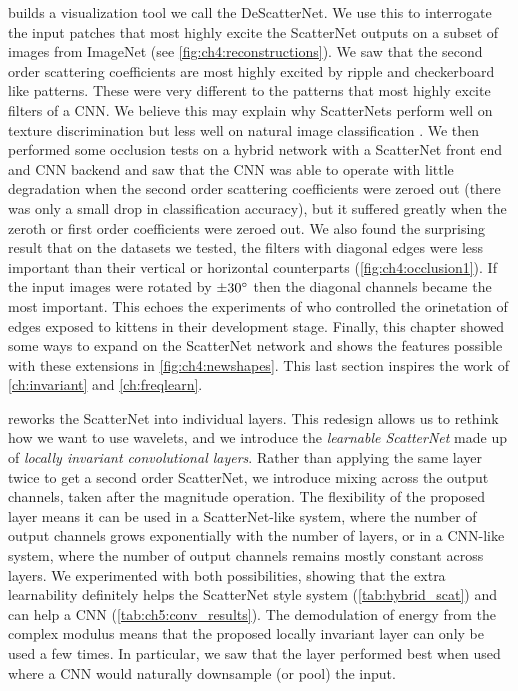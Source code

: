 \textbf{} builds a visualization tool we call the
DeScatterNet. We use this to interrogate the input patches that most highly
excite the ScatterNet outputs on a subset of images from ImageNet (see
\autoref{fig:ch4:reconstructions}). We saw that
the second order scattering coefficients are most highly excited by ripple and
checkerboard like patterns. These were very different to the patterns
that most highly excite filters of a CNN. We believe this may explain why
ScatterNets perform well on texture discrimination \cite{bruna_invariant_2013}
but less well on natural image classification \cite{oyallon_deep_2015}. We then
performed some occlusion tests on a hybrid network with a ScatterNet front end
and CNN backend and saw that the CNN was able to operate with little degradation when the second
order scattering coefficients were zeroed out (there was only a small drop in
classification accuracy), but it suffered greatly when the zeroth or first order
coefficients were zeroed out. We also found the surprising result that on the
datasets we tested, the filters with diagonal edges were less important than their vertical or 
horizontal counterparts (\autoref{fig:ch4:occlusion1}). If the input images were
rotated by $\pm 30^{\circ}$ then the diagonal channels became the most important.
This echoes the experiments of
\citeauthor{blakemore_development_1970}\cite{blakemore_development_1970} who
controlled the orinetation of edges exposed to kittens in their development
stage. Finally, this chapter showed some ways to expand on the ScatterNet
network and shows the features possible with these extensions in \autoref{fig:ch4:newshapes}. 
This last section inspires the work of \autoref{ch:invariant}
and \autoref{ch:freqlearn}. 

\textbf{} reworks the ScatterNet into individual layers.
This redesign allows us to rethink how we want to use wavelets, and we introduce
the \emph{learnable ScatterNet} made up of \emph{locally invariant convolutional
layers}. Rather than applying the same layer twice to get a second order
ScatterNet, we introduce mixing across the output channels, taken after the
magnitude operation. The flexibility of the proposed layer means it can be used
in a ScatterNet-like system, where the number of output channels grows
exponentially with the number of layers, or in a CNN-like system, where the
number of output channels remains mostly constant across layers. We experimented
with both possibilities, showing that the extra learnability definitely helps
the ScatterNet style system (\autoref{tab:hybrid_scat}) and can help a CNN
(\autoref{tab:ch5:conv_results}). The demodulation of energy from the complex
modulus means that the proposed locally invariant layer can only be used a few
times. In particular, we saw that the layer performed best when used where a CNN
would naturally downsample (or pool) the input.

